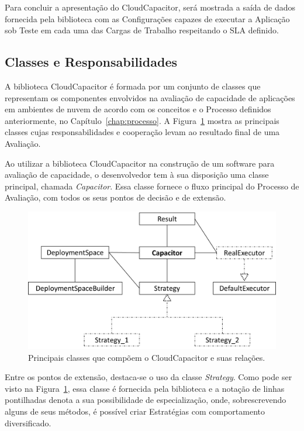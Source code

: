 Para concluir a apresentação do CloudCapacitor, será mostrada a saída de dados
fornecida pela biblioteca com as Configurações capazes de executar a
Aplicação sob Teste em cada uma das Cargas de Trabalho respeitando o SLA definido.

\subsection{Classes e Responsabilidades}
\label{subsec:classes}
A biblioteca CloudCapacitor é formada por um conjunto de classes que representam os
componentes envolvidos na avaliação de capacidade de aplicações em ambientes de
nuvem de acordo com os conceitos e o Processo definidos anteriormente, no
Capítulo~\ref{chap:processo}. A Figura~\ref{fig:classes}
mostra as principais classes cujas responsabilidades e cooperação levam ao 
resultado final de uma Avaliação. 

Ao utilizar a biblioteca CloudCapacitor na construção de um software para avaliação
de capacidade, o desenvolvedor tem à sua disposição uma classe principal, chamada
\emph{Capacitor}. Essa classe fornece o fluxo principal do Processo de
Avaliação, com todos os seus pontos de decisão e de extensão.

\begin{figure}[t]
  \begin{center}
    \includegraphics[scale=0.65]{img/CapacitorClasses}
  \end{center}
  \caption{\label{fig:classes}Principais classes que compõem o CloudCapacitor e suas relações.}
\end{figure}

Entre os pontos de extensão, destaca-se o uso da classe \emph{Strategy}. Como 
pode ser visto na Figura~\ref{fig:classes}, essa classe é fornecida pela biblioteca e a
notação de linhas pontilhadas denota a sua possibilidade de especialização, onde,
sobrescrevendo alguns de seus métodos, é possível criar Estratégias com comportamento
diversificado.


